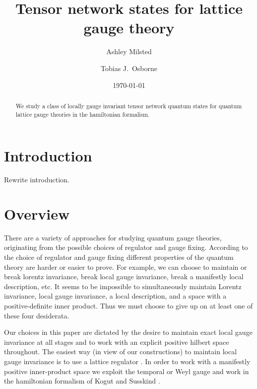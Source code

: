\documentclass[12pt]{amsart}
\theoremstyle{definition}
\theoremstyle{remark}
\numberwithin{equation}{section}
\begin{document}
%

\title[TNS for lattice gauge theory]{Tensor network states for lattice gauge theory}

\author{Ashley Milsted}
\address{Leibniz Universit\"at Hannover, Institute of Theoretical Physics, Appelstra{\ss}e 2, D-30167 Hannover, Germany}
\author{Tobias J.\ Osborne}
\address{Leibniz Universit\"at Hannover, Institute of Theoretical Physics, Appelstra{\ss}e 2, D-30167 Hannover, Germany}

\date{\today}

\begin{abstract}
	We study a class of locally gauge invariant tensor network quantum states for quantum lattice gauge theories in the hamiltonian formalism. 
\end{abstract}

\maketitle

\section{Introduction}

{\color{red} Rewrite introduction.}


\section{Overview}
There are a variety of approaches for studying quantum gauge theories, originating from the possible choices of regulator and gauge fixing. According to the choice of regulator and gauge fixing different properties of the quantum theory are harder or easier to prove. For example, we can choose to maintain or break lorentz invariance, break local gauge invariance, break a manifestly local description, etc. It seems to be impossible to simultaneously maintain Lorentz invariance, local gauge invariance, a local description, and a space with a positive-definite inner product. Thus we must choose to give up on at least one of these four desiderata. 

Our choices in this paper are dictated by the desire to maintain exact local gauge invariance at all stages and to work with an explicit positive hilbert space throughout. The easiest way (in view of our constructions) to maintain local gauge invariance is to use a lattice regulator \cite{wilson:1974b, creutz:1985a}. In order to work with a manifestly positive inner-product space we exploit the temporal or Weyl gauge and work in the hamiltonian formalism of Kogut and Susskind \cite{kogut:1975a}. 
\end{document}
